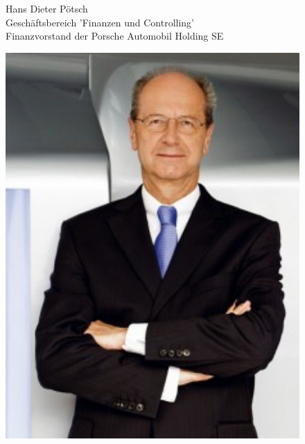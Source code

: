\documentclass[12pt]{article}
\begin{document}
\begin{figure}[here!]
	\centering
	\begin{minipage}[h]{0.65\textwidth}
		Hans Dieter Pötsch\\
		Geschäftsbereich 'Finanzen und Controlling'\\
		Finanzvorstand der Porsche Automobil Holding SE
	\end{minipage}
	\begin{minipage}[h]{0.10\textwidth}
		\hspace{1cm} 
	\end{minipage}
	\begin{minipage}[h]{0.20\textwidth}
		\centering
		\includegraphics[width=1.0\textwidth]{images/HansPoetsch.jpg}
		\label{fig:vorstandvw7}
		\cite{dppic}
	\end{minipage}
\end{figure}
\end{document}
